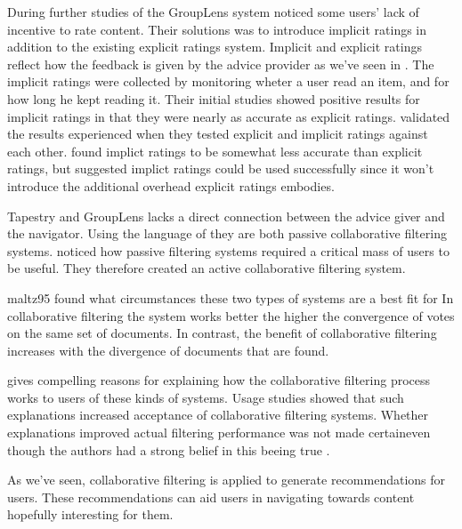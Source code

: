 During further studies of the GroupLens system \citet[]{konstan97}
noticed some users' lack of incentive to rate content. Their solutions
was to introduce implicit ratings in addition to the existing explicit ratings
system. Implicit and explicit ratings reflect how the feedback is given by the
advice provider as we've seen in
.
The implicit ratings were collected by monitoring wheter a user read
an item, and for how long he kept reading it. Their initial studies showed
positive results for implicit ratings in that they were nearly as accurate as
explicit ratings. \citet[]{claypool01} validated the results
\citeauthor{konstan97} experienced when they tested explicit and implicit
ratings against each other. \citeauthor{claypool01} found implict ratings
to be somewhat less accurate than explicit ratings, but suggested implict
ratings could be used successfully since it won't introduce the additional
overhead explicit ratings embodies.

Tapestry and GroupLens lacks a direct connection
between the advice giver and the navigator. Using the language of
\citet{dieberger97} they are both passive collaborative filtering systems.
\citet{maltz95} noticed how passive filtering systems required a
critical mass of users to be useful. They therefore created an active
collaborative filtering system.
\begin{fullquote}{maltz95}{%
  found what circumstances these two types of systems are a best fit for}
    In  collaborative filtering the system works better the higher
    the convergence of votes on the same set of documents. In contrast, the
    benefit of  collaborative filtering increases with the
    divergence of documents that are found.
\end{fullquote}

\citet[]{herlocker00} gives compelling reasons for explaining
how the collaborative filtering process works to users of these kinds of
systems. Usage studies showed that such explanations increased acceptance of
collaborative filtering systems. Whether explanations improved actual
filtering performance was not made certain\dash{}even though
the authors had a strong belief in this beeing true
\citep[]{herlocker00}.

As we've seen, collaborative filtering is applied to generate
recommendations for users. These recommendations can aid users in navigating
towards content hopefully interesting for them.

